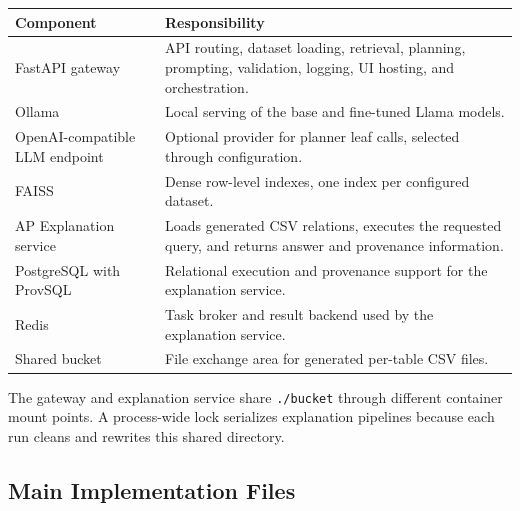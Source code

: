 \documentclass[11pt,a4paper]{article}
\newcommand{\code}[1]{\texttt{#1}}
\begin{document}
\begin{longtable}{>{\raggedright\arraybackslash}p{} >{\raggedright\arraybackslash}p{}}
\toprule
\textbf{Component} & \textbf{Responsibility} \\
\midrule
\endhead
FastAPI gateway & API routing, dataset loading, retrieval, planning, prompting,
validation, logging, UI hosting, and orchestration. \\
Ollama & Local serving of the base and fine-tuned Llama models. \\
OpenAI-compatible LLM endpoint & Optional provider for planner leaf calls, selected
through configuration. \\
FAISS & Dense row-level indexes, one index per configured dataset. \\
AP Explanation service & Loads generated CSV relations, executes the requested
query, and returns answer and provenance information. \\
PostgreSQL with ProvSQL & Relational execution and provenance support for the
explanation service. \\
Redis & Task broker and result backend used by the explanation service. \\
Shared bucket & File exchange area for generated per-table CSV files. \\
\bottomrule
\end{longtable}

The gateway and explanation service share \code{./bucket} through different
container mount points. A process-wide lock serializes explanation pipelines
because each run cleans and rewrites this shared directory.

\subsection{Main Implementation Files}
\end{document}
